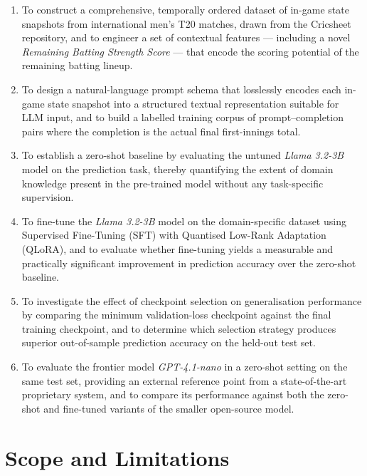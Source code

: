 \begin{enumerate}
    \item To construct a comprehensive, temporally ordered dataset of in-game state snapshots from international men's T20 matches, drawn from the Cricsheet repository, and to engineer a set of contextual features --- including a novel \textit{Remaining Batting Strength Score} --- that encode the scoring potential of the remaining batting lineup.

    \item To design a natural-language prompt schema that losslessly encodes each in-game state snapshot into a structured textual representation suitable for LLM input, and to build a labelled training corpus of prompt--completion pairs where the completion is the actual final first-innings total.

    \item To establish a zero-shot baseline by evaluating the untuned \textit{Llama 3.2-3B} model on the prediction task, thereby quantifying the extent of domain knowledge present in the pre-trained model without any task-specific supervision.

    \item To fine-tune the \textit{Llama 3.2-3B} model on the domain-specific dataset using Supervised Fine-Tuning (SFT) with Quantised Low-Rank Adaptation (QLoRA), and to evaluate whether fine-tuning yields a measurable and practically significant improvement in prediction accuracy over the zero-shot baseline.

    \item To investigate the effect of checkpoint selection on generalisation performance by comparing the minimum validation-loss checkpoint against the final training checkpoint, and to determine which selection strategy produces superior out-of-sample prediction accuracy on the held-out test set.

    \item To evaluate the frontier model \textit{GPT-4.1-nano} in a zero-shot setting on the same test set, providing an external reference point from a state-of-the-art proprietary system, and to compare its performance against both the zero-shot and fine-tuned variants of the smaller open-source model.
\end{enumerate}

\section{Scope and Limitations}

